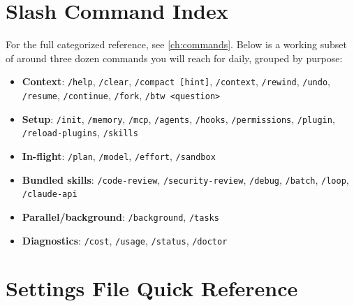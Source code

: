 \section{Slash Command Index}
\label{app:slash-index}

For the full categorized reference, see \cref{ch:commands}. Below is a
working subset of around three dozen commands you will reach for daily,
grouped by purpose:

\begin{itemize}
  \item \textbf{Context}: \texttt{/help}, \texttt{/clear},
        \texttt{/compact [hint]}, \texttt{/context}, \texttt{/rewind},
        \texttt{/undo}, \texttt{/resume}, \texttt{/continue},
        \texttt{/fork}, \texttt{/btw <question>}
  \item \textbf{Setup}: \texttt{/init}, \texttt{/memory}, \texttt{/mcp},
        \texttt{/agents}, \texttt{/hooks}, \texttt{/permissions},
        \texttt{/plugin}, \texttt{/reload-plugins}, \texttt{/skills}
  \item \textbf{In-flight}: \texttt{/plan}, \texttt{/model},
        \texttt{/effort}, \texttt{/sandbox}
  \item \textbf{Bundled skills}: \texttt{/code-review},
        \texttt{/security-review}, \texttt{/debug}, \texttt{/batch},
        \texttt{/loop}, \texttt{/claude-api}
  \item \textbf{Parallel/background}: \texttt{/background},
        \texttt{/tasks}
  \item \textbf{Diagnostics}: \texttt{/cost}, \texttt{/usage},
        \texttt{/status}, \texttt{/doctor}
\end{itemize}

\section{Settings File Quick Reference}
\label{app:settings-files}

